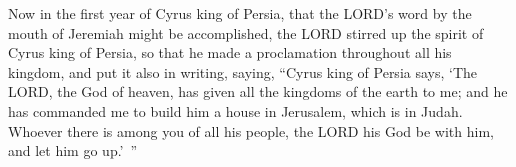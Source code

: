 \myverse{}Now in the first year of Cyrus king of Persia, that the LORD’s
word by the mouth of Jeremiah might be accomplished, the LORD stirred up the spirit of Cyrus king of Persia,
so that he made a proclamation throughout all his kingdom, and put it also in writing, saying,
\myverse{}“Cyrus king of Persia says, ‘The LORD, the God of heaven, has given all the
kingdoms of the earth to me; and he has commanded me to build him a house in Jerusalem, which is in Judah.
Whoever there is among you of all his people, the LORD his God be with him, and let him go up.’ ”


